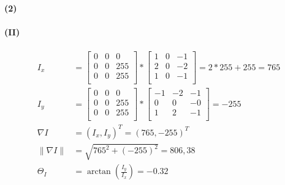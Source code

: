 \documentclass[a4paper]{article}
\begin{document}
\paragraph{(2)}
\paragraph{(II)}
\begin{align*}
    I_x &= \begin{bmatrix}
        0 & 0 & 0\\
        0 & 0 & 255\\
        0 & 0 & 255\\
        \end{bmatrix}
         * 
         \begin{bmatrix}
        1 & 0 & -1\\
        2 & 0 & -2\\
        1 & 0 & -1\\
        \end{bmatrix}
        = 2*255+255 = 765\\
        I_y &= \begin{bmatrix}
        0 & 0 & 0\\
        0 & 0 & 255\\
        0 & 0 & 255\\
        \end{bmatrix}
         * 
         \begin{bmatrix}
        -1 & -2 & -1\\
        0 & 0 & -0\\
        1 & 2 & -1\\
        \end{bmatrix}
        = -255\\
        \nabla I &= (I_x,I_y)^T = (765,-255)^T\\
        \| \nabla I\| &= \sqrt{765^2+(-255)^2} = 806,38\\
        \Theta_I &= \operatorname{arctan}(\frac{I_y}{I_x}) = -0.32
\end{align*}
\end{document}
